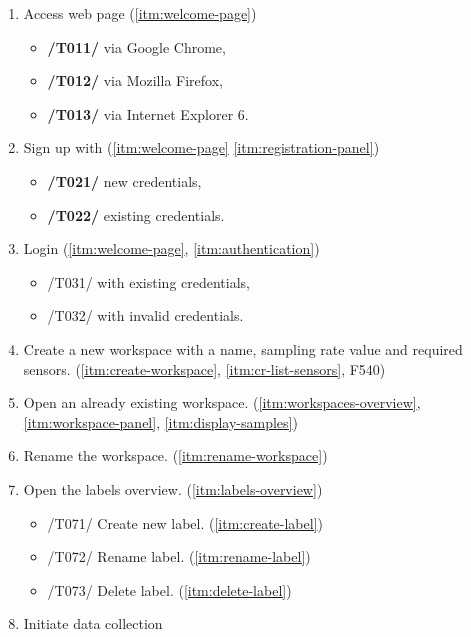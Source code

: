 \begin{enumerate}[{label = \textbf{/T{\protect\twodigits{\arabic{enumi}}}0/}, leftmargin = *}]
    \item Access web page (\ref{itm:welcome-page}) %
    \begin{itemize}
        \item \textbf{/T011/} via Google Chrome,
        \item \textbf{/T012/} via Mozilla Firefox,
        \item \textbf{/T013/} via Internet Explorer 6.
    \end{itemize}
    \item Sign up with (\ref{itm:welcome-page} \ref{itm:registration-panel})
    \begin{itemize}
        \item \textbf{/T021/} new credentials,
        \item \textbf{/T022/} existing credentials.
    \end{itemize}
    \item Login (\ref{itm:welcome-page}, \ref{itm:authentication})
    \begin{itemize}
        \item /T031/ with existing credentials,
        \item /T032/ with invalid credentials.
    \end{itemize}
    \item Create a new \gls{workspace} with a name, sampling rate value and required \glspl{sensor}. (\ref{itm:create-workspace}, \ref{itm:cr-list-sensors}, F540)
    \item Open an already existing \gls{workspace}. (\ref{itm:workspaces-overview}, \ref{itm:workspace-panel}, \ref{itm:display-samples})
    \item Rename the \gls{workspace}. (\ref{itm:rename-workspace})
    \item Open the labels overview. (\ref{itm:labels-overview})
    \begin{itemize}
        \item /T071/ Create new label. (\ref{itm:create-label})
        \item /T072/ Rename label. (\ref{itm:rename-label})
        \item /T073/ Delete label. (\ref{itm:delete-label})
    \end{itemize}
    \item Initiate data collection
    \begin{itemize}

\end{itemize}
\end{enumerate}

